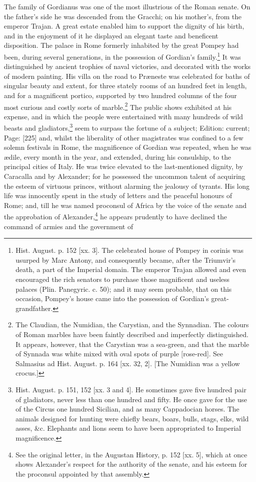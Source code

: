 The family of Gordianus was one of the most illustrious of the Roman senate. On the father\texthebrew{}’s side he was descended from the Gracchi; on his mother\texthebrew{}’s, from the emperor Trajan. A great estate enabled him to support the dignity of his birth, and in the enjoyment of it he displayed an elegant taste and beneficent disposition. The palace in Rome formerly inhabited by the great Pompey had been, during several generations, in the possession of Gordian\texthebrew{}’s family.\footnote{Hist. August. p. 152 [xx. 3]. The celebrated house of Pompey in corinis was usurped by Marc Antony, and consequently became, after the Triumvir\texthebrew{}’s death, a part of the Imperial domain. The emperor Trajan allowed and even encouraged the rich senators to purchase those magnificent and useless palaces (Plin. Panegyric. c. 50); and it may seem probable, that on this occasion, Pompey\texthebrew{}’s house came into the possession of Gordian\texthebrew{}’s great-grandfather.} It was distinguished by ancient trophies of naval victories, and decorated with the works of modern painting. His villa on the road to Præneste was celebrated for baths of singular beauty and extent, for three stately rooms of an hundred feet in length, and for a magnificent portico, supported by two hundred columns of the four most curious and costly sorts of marble.\footnote{The Claudian, the Numidian, the Carystian, and the Synnadian. The colours of Roman marbles have been faintly described and imperfectly distinguished. It appears, however, that the Carystian was a sea-green, and that the marble of Synnada was white mixed with oval spots of purple [rose-red]. See Salmasius ad Hist. August. p. 164 [xx. 32, 2]. [The Numidian was a yellow crocus.]} The public shows exhibited at his expense, and in which the people were entertained with many hundreds of wild beasts and gladiators,\footnote{Hist. August. p. 151, 152 [xx. 3 and 4]. He sometimes gave five hundred pair of gladiators, never less than one hundred and fifty. He once gave for the use of the Circus one hundred Sicilian, and as many Cappadocian horses. The animals designed for hunting were chiefly bears, boars, bulls, stags, elks, wild asses, \&c. Elephants and lions seem to have been appropriated to Imperial magnificence.} seem to surpass the fortune of a subject; Edition: current; Page: [225] and, whilst the liberality of other magistrates was confined to a few solemn festivals in Rome, the magnificence of Gordian was repeated, when he was ædile, every month in the year, and extended, during his consulship, to the principal cities of Italy. He was twice elevated to the last-mentioned dignity, by Caracalla and by Alexander; for he possessed the uncommon talent of acquiring the esteem of virtuous princes, without alarming the jealousy of tyrants. His long life was innocently spent in the study of letters and the peaceful honours of Rome; and, till he was named proconsul of Africa by the voice of the senate and the approbation of Alexander,\footnote{See the original letter, in the Augustan History, p. 152 [xx. 5], which at once shows Alexander\texthebrew{}’s respect for the authority of the senate, and his esteem for the proconsul appointed by that assembly.} he appears prudently to have declined the command of armies and the government of 